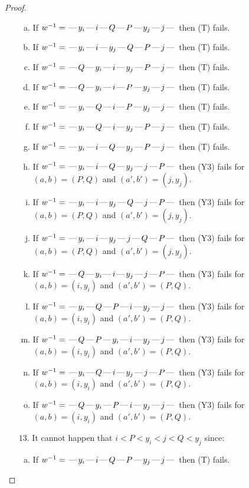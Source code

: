 \documentclass[10pt]{article}
\theoremstyle{definition}
\theoremstyle{definition}
\def\dash{\text{\hspace{0.5mm}---\hspace{0.5mm}}}
\begin{document}
\begin{proof}
\begin{enumerate}
\begin{enumerate}[(a)]
\item If $w^{-1} = \dash y_i\dash i\dash Q\dash P\dash y_j\dash j\dash $ then (T) fails.
\item If $w^{-1} = \dash y_i\dash i\dash y_j\dash Q\dash P\dash j\dash $ then (T) fails.
\item If $w^{-1} = \dash Q\dash y_i\dash i\dash y_j\dash P\dash j\dash $ then (T) fails.
\item If $w^{-1} = \dash Q\dash y_i\dash i\dash P\dash y_j\dash j\dash $ then (T) fails.
\item If $w^{-1} = \dash y_i\dash Q\dash i\dash P\dash y_j\dash j\dash $ then (T) fails.
\item If $w^{-1} = \dash y_i\dash Q\dash i\dash y_j\dash P\dash j\dash $ then (T) fails.
\item If $w^{-1} = \dash y_i\dash i\dash Q\dash y_j\dash P\dash j\dash $ then (T) fails.
\item If $w^{-1} = \dash y_i\dash i\dash Q\dash y_j\dash j\dash P\dash $ then (Y3) fails for $(a,b)=(P,Q)$ and $(a',b')=(j,y_j)$.
\item If $w^{-1} = \dash y_i\dash i\dash y_j\dash Q\dash j\dash P\dash $ then (Y3) fails for $(a,b)=(P,Q)$ and $(a',b')=(j,y_j)$.
\item If $w^{-1} = \dash y_i\dash i\dash y_j\dash j\dash Q\dash P\dash $ then (Y3) fails for $(a,b)=(P,Q)$ and $(a',b')=(j,y_j)$.
\item If $w^{-1} = \dash Q\dash y_i\dash i\dash y_j\dash j\dash P\dash $ then (Y3) fails for $(a,b)=(i,y_i)$ and $(a',b')=(P,Q)$.
\item If $w^{-1} = \dash y_i\dash Q\dash P\dash i\dash y_j\dash j\dash $ then (Y3) fails for $(a,b)=(i,y_i)$ and $(a',b')=(P,Q)$.
\item If $w^{-1} = \dash Q\dash P\dash y_i\dash i\dash y_j\dash j\dash $ then (Y3) fails for $(a,b)=(i,y_i)$ and $(a',b')=(P,Q)$.
\item If $w^{-1} = \dash y_i\dash Q\dash i\dash y_j\dash j\dash P\dash $ then (Y3) fails for $(a,b)=(i,y_i)$ and $(a',b')=(P,Q)$.
\item If $w^{-1} = \dash Q\dash y_i\dash P\dash i\dash y_j\dash j\dash $ then (Y3) fails for $(a,b)=(i,y_i)$ and $(a',b')=(P,Q)$.
\end{enumerate}
\item[$13$.] It cannot happen that $i < P < y_i < j < Q < y_j$ since:
\begin{enumerate}[(a)]
\item If $w^{-1} = \dash y_i\dash i\dash Q\dash P\dash y_j\dash j\dash $ then (T) fails.

\end{enumerate}
\end{enumerate}
\end{proof}
\end{document}
